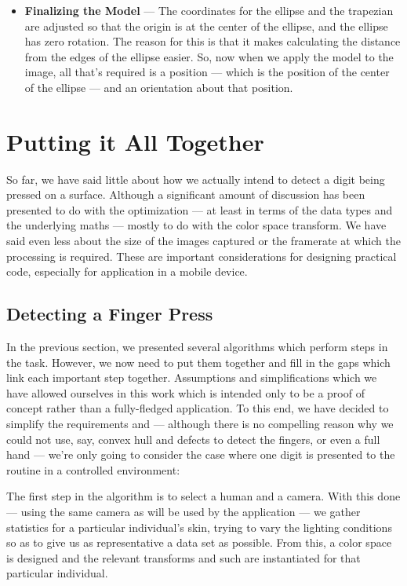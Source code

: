 \begin{itemize}
\item \textbf{Finalizing the Model} --- The coordinates for the ellipse and the trapezian are adjusted so that the origin is at the center of the ellipse, and the ellipse has zero rotation. The reason for this is that it makes calculating the distance from the edges of the ellipse easier. So, now when we apply the model to the image, all that's required is a position --- which is the position of the center of the ellipse --- and an orientation about that position. 
\end{itemize}


\section{Putting it All Together}\label{sec:PuttingItAllTogether}

So far, we have said little about how we actually intend to detect a digit being pressed on a surface. Although a significant amount of discussion has been presented to do with the optimization --- at least in terms of the data types and the underlying maths --- mostly to do with the color space transform. We have said even less about the size of the images captured or the framerate at which the processing is required. These are important considerations for designing practical code, especially for application in a mobile device.

\subsection{Detecting a Finger Press}\label{sec:DetectingAFingerPress}

In the previous section, we presented several algorithms which perform steps in the task. However, we now need to put them together and fill in the gaps which link each important step together. Assumptions and simplifications which we have allowed ourselves in this work which is intended only to be a proof of concept rather than a fully-fledged application. To this end, we have decided to simplify the requirements and --- although there is no compelling reason why we could not use, say, convex hull and defects to detect the fingers, or even a full hand --- we're only going to consider the case where one digit is presented to the routine in a controlled environment:

The first step in the algorithm is to select a human and a camera. With this done --- using the same camera as will be used by the application --- we gather statistics for a particular individual's skin, trying to vary the lighting conditions so as to give us as representative a data set as possible. From this, a color space is designed and the relevant transforms and such are instantiated for that particular individual.

